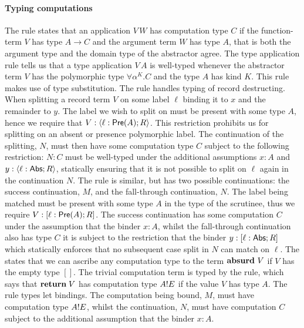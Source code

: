 \documentclass[12pt,phd,lfcs,twoside,openright,logo,leftchapter,normalheadings]{infthesis}
\theoremstyle{plain}
\theoremstyle{definition}
\begin{document}
\paragraph{Typing computations}
The  rule states that an application $V\,W$ has computation
type $C$ if the function-term $V$ has type $A \to C$ and the
argument term $W$ has type $A$, that is both the argument type and the
domain type of the abstractor agree.
%
The type application rule  tells us that a type
application $V\,A$ is well-typed whenever the abstractor term $V$ has
the polymorphic type $\forall \alpha^K.C$ and the type $A$ has kind
$K$. This rule makes use of type substitution.
%
The  rule handles typing of record destructing. When
splitting a record term $V$ on some label $\ell$ binding it to $x$ and
the remainder to $y$. The label we wish to split on must be present
with some type $A$, hence we require that
$V : \langle \ell : \mathsf{Pre}(A); R \rangle$. This restriction prohibits us for
splitting on an absent or presence polymorphic label.  The
continuation of the splitting, $N$, must then have some computation
type $C$ subject to the following restriction: $N : C$ must be
well-typed under the additional assumptions $x : A$ and
$y : \langle \ell : \mathsf{Abs}; R \rangle$, statically ensuring that it is not
possible to split on $\ell$ again in the continuation $N$.
%
The  rule is similar, but has two possible continuations:
the success continuation, $M$, and the fall-through continuation, $N$.
The label being matched must be present with some type $A$ in the type
of the scrutinee, thus we require $V : [\ell : \mathsf{Pre}(A);R]$. The
success continuation has some computation $C$ under the assumption
that the binder $x : A$, whilst the fall-through continuation also has
type $C$ it is subject to the restriction that the binder
$y : [\ell : \mathsf{Abs};R]$ which statically enforces that no subsequent
case split in $N$ can match on $\ell$.
%
The  states that we can ascribe any computation type to
the term $\mathbf{absurd}~V$ if $V$ has the empty type $[]$.
%
The trivial computation term is typed by the  rule,
which says that $\mathbf{return}\;V$ has computation type $A ! E$ if the
value $V$ has type $A$.
%
The  rule types let bindings. The computation being bound,
$M$, must have computation type $A ! E$, whilst the continuation,
$N$, must have computation $C$ subject to the additional assumption
that the binder $x : A$.
\end{document}
